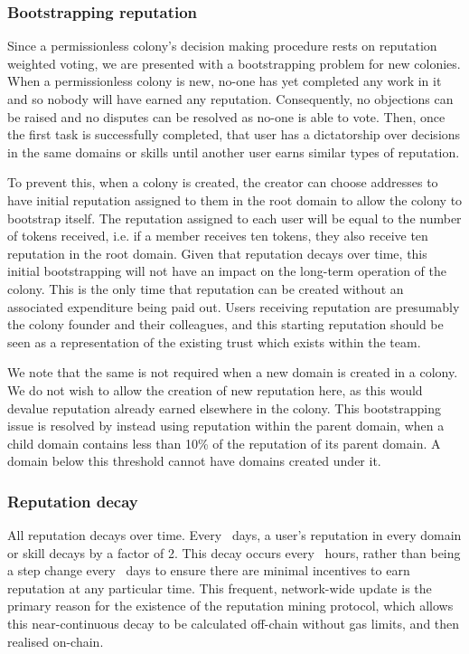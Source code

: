 \subsubsection*{Bootstrapping reputation}\label{sec:bootstrapping-rep}

Since a permissionless colony's decision making procedure rests on reputation weighted voting, we are presented with a bootstrapping problem for new colonies. When a permissionless colony is new, no-one has yet completed any work in it and so nobody will have earned any reputation. Consequently, no objections can be raised and no disputes can be resolved as no-one is able to vote. Then, once the first task is successfully completed, that user has a dictatorship over decisions in the same domains or skills until another user earns similar types of reputation.

To prevent this, when a colony is created, the creator can choose addresses to have initial reputation assigned to them in the root domain to allow the colony to bootstrap itself. The reputation assigned to each user will be equal to the number of tokens received, i.e. if a member receives ten tokens, they also receive ten reputation in the root domain. Given that reputation decays over time, this initial bootstrapping will not have an impact on the long-term operation of the colony. This is the only time that reputation can be created without an associated expenditure being paid out. Users receiving reputation are presumably the colony founder and their colleagues, and this starting reputation should be seen as a representation of the existing trust which exists within the team.

We note that the same is not required when a new domain is created in a colony. We do not wish to allow the creation of new reputation here, as this would devalue reputation already earned elsewhere in the colony. This bootstrapping issue is resolved by instead using reputation within the parent domain, when a child domain contains less than 10\% of the reputation of its parent domain. A domain below this threshold cannot have domains created under it.

\subsubsection*{Reputation decay}

All reputation decays over time. Every \repdecayduration\ days, a user's reputation in every domain or skill decays by a factor of 2. This decay occurs every \miningcycleduration\ hours, rather than being a step change every \repdecayduration\ days to ensure there are minimal incentives to earn reputation at any particular time. This frequent, network-wide update is the primary reason for the existence of the reputation mining protocol, which allows this near-continuous decay to be calculated off-chain without gas limits, and then realised on-chain.

